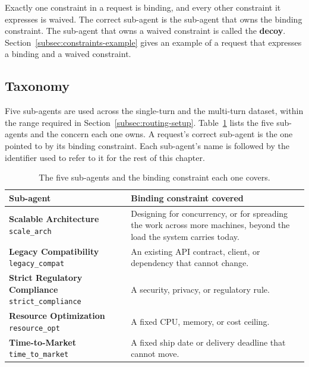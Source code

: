 Exactly one constraint in a request is binding, and every other constraint it expresses is waived. The correct sub-agent is the sub-agent that owns the binding constraint. The sub-agent that owns a waived constraint is called the \textbf{decoy}. Section~\ref{subsec:constraints-example} gives an example of a request that expresses a binding and a waived constraint.

\subsection{Taxonomy}
\label{subsec:sub-agent-taxonomy}

Five sub-agents are used across the single-turn and the multi-turn dataset, within the range required in Section~\ref{subsec:routing-setup}. Table~\ref{tab:sub-agent-taxonomy} lists the five sub-agents and the concern each one owns. A request's correct sub-agent is the one pointed to by its binding constraint. Each sub-agent's name is followed by the identifier used to refer to it for the rest of this chapter.

\begin{table}[H]
    \centering
    \renewcommand{\tabularxcolumn}[1]{m{#1}}
    \begin{tabularx}{\textwidth}{@{}>{\raggedright\arraybackslash}m{6.2cm}>{\raggedright\hyphenpenalty=10000\exhyphenpenalty=10000\arraybackslash}X@{}}
        \toprule
        \textbf{Sub-agent} & \textbf{Binding constraint covered} \\
        \midrule
        \textbf{Scalable Architecture} \newline \texttt{scale\_arch} & Designing for concurrency, or for spreading the work across more machines, beyond the load the system carries today. \\ \addlinespace[0.9em]
        \textbf{Legacy Compatibility} \newline \texttt{legacy\_compat} & An existing API contract, client, or dependency that cannot change. \\ \addlinespace[0.9em]
        \textbf{Strict Regulatory Compliance} \newline \texttt{strict\_compliance} & A security, privacy, or regulatory rule. \\ \addlinespace[0.9em]
        \textbf{Resource Optimization} \newline \texttt{resource\_opt} & A fixed CPU, memory, or cost ceiling. \\ \addlinespace[0.9em]
        \textbf{Time-to-Market} \newline \texttt{time\_to\_market} & A fixed ship date or delivery deadline that cannot move. \\
        \bottomrule
    \end{tabularx}
    \caption[The five sub-agents and the binding constraint each one covers]{The five sub-agents and the binding constraint each one covers.}
    \label{tab:sub-agent-taxonomy}
\end{table}

